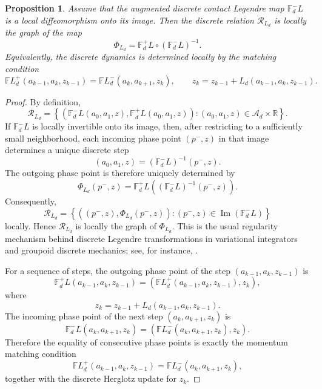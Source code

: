 \documentclass[11pt]{article}
\newtheorem{proposition}[theorem]{Proposition}
\newcommand{\R}{\mathbb{R}}
\newcommand{\mc}[1]{\mathcal{#1}}
\newcommand{\FL}{\mathbb{F}L}
\begin{document}
\begin{proposition}
\label{prop:discrete-regular-implicit}
Assume that the augmented discrete contact Legendre map
\(\mathbb F_d^-L\) is a local diffeomorphism onto its image. Then the discrete
relation \(\mc R_{L_d}\) is locally the graph of the map
\[
\Phi_{L_d}
=
\mathbb F_d^+L\circ
\left(\mathbb F_d^-L\right)^{-1}.
\]
Equivalently, the discrete dynamics is determined locally by the matching
condition
\[
\FL_d^+(a_{k-1},a_k,z_{k-1})
=
\FL_d^-(a_k,a_{k+1},z_k),
\qquad
z_k=z_{k-1}+L_d(a_{k-1},a_k,z_{k-1}).
\]

\end{proposition}

\begin{proof}
By definition,
\[
\mc R_{L_d}
=
\left\{
\left(
\mathbb F_d^-L(a_0,a_1,z),
\mathbb F_d^+L(a_0,a_1,z)
\right)
:
(a_0,a_1,z)\in \mc A_d\times\R
\right\}.
\]
If \(\mathbb F_d^-L\) is locally invertible onto its image, then, after
restricting to a sufficiently small neighborhood, each incoming phase point
\((p^-,z)\) in that image determines a unique discrete step
\[
(a_0,a_1,z)
=
(\mathbb F_d^-L)^{-1}(p^-,z).
\]
The outgoing phase point is therefore uniquely determined by
\[
\Phi_{L_d}(p^-,z)
=
\mathbb F_d^+L
\left(
(\mathbb F_d^-L)^{-1}(p^-,z)
\right).
\]
Consequently,
\[
\mc R_{L_d}
=
\left\{
\left(
(p^-,z),
\Phi_{L_d}(p^-,z)
\right)
:
(p^-,z)\in \operatorname{Im}(\mathbb F_d^-L)
\right\}
\]
locally. Hence \(\mc R_{L_d}\) is locally the graph of \(\Phi_{L_d}\).
This is the usual regularity mechanism behind discrete Legendre
transformations in variational integrators and groupoid discrete mechanics;
see, for instance, \cite{MarsdenWest2001,MarreroMartinDeDiegoStern2015}.

For a sequence of steps, the outgoing phase point of the step
\((a_{k-1},a_k,z_{k-1})\) is
\[
\mathbb F_d^+L(a_{k-1},a_k,z_{k-1})
=
\left(
\FL_d^+(a_{k-1},a_k,z_{k-1}),
z_k
\right),
\]
where
\[
z_k=z_{k-1}+L_d(a_{k-1},a_k,z_{k-1}).
\]
The incoming phase point of the next step \((a_k,a_{k+1},z_k)\) is
\[
\mathbb F_d^-L(a_k,a_{k+1},z_k)
=
\left(
\FL_d^-(a_k,a_{k+1},z_k),
z_k
\right).
\]
Therefore the equality of consecutive phase points is exactly the momentum
matching condition
\[
\FL_d^+(a_{k-1},a_k,z_{k-1})
=
\FL_d^-(a_k,a_{k+1},z_k),
\]
together with the discrete Herglotz update for \(z_k\).
\end{proof}
\end{document}
